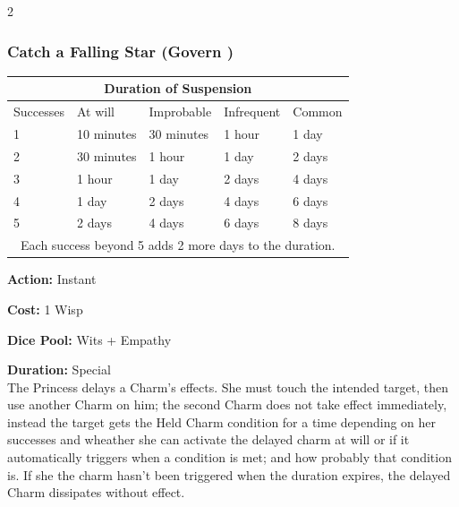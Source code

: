 \begin{multicols}{2}
\subsubsection*{Catch a Falling Star (Govern \textbullet\textbullet\textbullet)}
	\bigsidebarstart

 \centering 
    \begin{tabular}{|l|l|l|l|l|}
        \hline
        \multicolumn{5}{|c|}{Duration of Suspension}                                         \\ \hline
        Successes                                                & At will    & Improbable & Infrequent & Common  \\ \hline
        1                                                        & 10 minutes & 30 minutes & 1 hour     & 1 day   \\ \hline
        2                                                        & 30 minutes & 1 hour     & 1 day      & 2 days  \\ \hline
        3                                                        & 1 hour     & 1 day      & 2 days     & 4 days  \\ \hline
        4                                                        & 1 day      & 2 days     & 4 days     & 6 days  \\ \hline
        5                                                        & 2 days     & 4 days     & 6 days     & 8 days  \\ \hline
        \multicolumn{5}{|c|}{Each success beyond 5 adds 2 more days to the duration.}        \\
        \hline
    \end{tabular}
    \bigsidebarend


\noindent \textbf{Action:} Instant

\noindent \textbf{Cost:} 1 Wisp

\noindent \textbf{Dice Pool:} Wits + Empathy

\noindent \textbf{Duration:} Special \\

\noindent The Princess delays a Charm's effects. She must touch the intended target, then use another Charm on him; the second Charm does not take effect immediately, instead the target gets the Held Charm condition for a time depending on her successes and wheather she can activate the delayed charm at will or if it automatically triggers when a condition is met; and how probably that condition is. If she the charm hasn't been triggered when the duration  expires, the delayed Charm dissipates without effect. 


\end{multicols}

